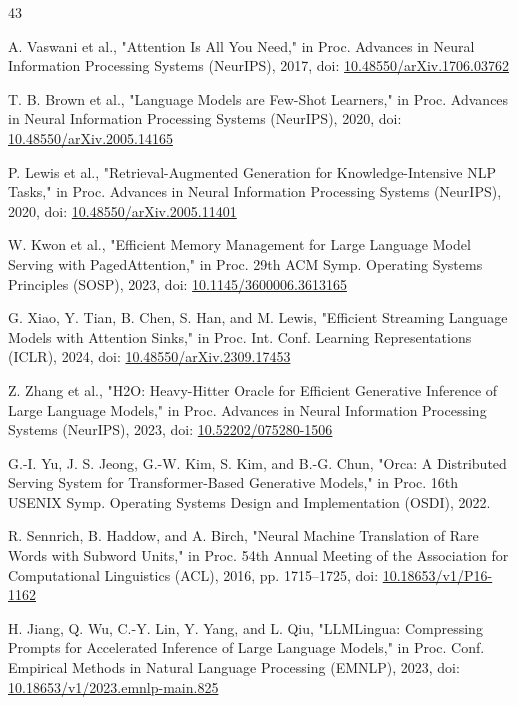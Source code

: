 \begin{thebibliography}{43}

 A. Vaswani et al., "Attention Is All You Need," in Proc. Advances in Neural Information Processing Systems (NeurIPS), 2017, doi: \href{https://doi.org/10.48550/arXiv.1706.03762}{10.48550/arXiv.1706.03762}

 T. B. Brown et al., "Language Models are Few-Shot Learners," in Proc. Advances in Neural Information Processing Systems (NeurIPS), 2020, doi: \href{https://doi.org/10.48550/arXiv.2005.14165}{10.48550/arXiv.2005.14165}

 P. Lewis et al., "Retrieval-Augmented Generation for Knowledge-Intensive NLP Tasks," in Proc. Advances in Neural Information Processing Systems (NeurIPS), 2020, doi: \href{https://doi.org/10.48550/arXiv.2005.11401}{10.48550/arXiv.2005.11401}

 W. Kwon et al., "Efficient Memory Management for Large Language Model Serving with PagedAttention," in Proc. 29th ACM Symp. Operating Systems Principles (SOSP), 2023, doi: \href{https://doi.org/10.1145/3600006.3613165}{10.1145/3600006.3613165}

 G. Xiao, Y. Tian, B. Chen, S. Han, and M. Lewis, "Efficient Streaming Language Models with Attention Sinks," in Proc. Int. Conf. Learning Representations (ICLR), 2024, doi: \href{https://doi.org/10.48550/arXiv.2309.17453}{10.48550/arXiv.2309.17453}

 Z. Zhang et al., "H2O: Heavy-Hitter Oracle for Efficient Generative Inference of Large Language Models," in Proc. Advances in Neural Information Processing Systems (NeurIPS), 2023, doi: \href{https://doi.org/10.52202/075280-1506}{10.52202/075280-1506}

 G.-I. Yu, J. S. Jeong, G.-W. Kim, S. Kim, and B.-G. Chun, "Orca: A Distributed Serving System for Transformer-Based Generative Models," in Proc. 16th USENIX Symp. Operating Systems Design and Implementation (OSDI), 2022.

 R. Sennrich, B. Haddow, and A. Birch, "Neural Machine Translation of Rare Words with Subword Units," in Proc. 54th Annual Meeting of the Association for Computational Linguistics (ACL), 2016, pp. 1715--1725, doi: \href{https://doi.org/10.18653/v1/P16-1162}{10.18653/v1/P16-1162}

 H. Jiang, Q. Wu, C.-Y. Lin, Y. Yang, and L. Qiu, "LLMLingua: Compressing Prompts for Accelerated Inference of Large Language Models," in Proc. Conf. Empirical Methods in Natural Language Processing (EMNLP), 2023, doi: \href{https://doi.org/10.18653/v1/2023.emnlp-main.825}{10.18653/v1/2023.emnlp-main.825}


\end{thebibliography}
